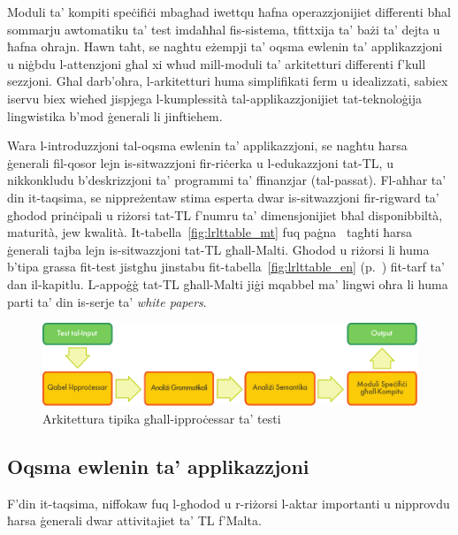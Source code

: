\documentclass[]{../../metanetpaper}
\begin{document}
\begin{multicols}{2}
Moduli ta’ kompiti speċifiċi mbagħad iwettqu ħafna operazzjonijiet differenti bħal sommarju awtomatiku ta’ test imdaħħal fis-sistema, tfittxija ta’ bażi ta' dejta u ħafna oħrajn. Hawn taħt, se nagħtu eżempji ta’ oqsma ewlenin ta’ applikazzjoni u niġbdu l-attenzjoni għal xi wħud mill-moduli ta’ arkitetturi differenti f'kull sezzjoni. Għal darb’oħra, l-arkitetturi huma simplifikati ferm u idealizzati, sabiex iservu biex wieħed jispjega l-kumplessità tal-applikazzjonijiet tat-teknoloġija lingwistika b'mod ġenerali li jinftiehem.

Wara l-introduzzjoni tal-oqsma ewlenin ta’ applikazzjoni, se nagħtu ħarsa ġenerali fil-qosor lejn is-sitwazzjoni fir-riċerka u l-edukazzjoni tat-TL, u nikkonkludu b’deskrizzjoni ta’ programmi ta’ ffinanzjar (tal-passat). Fl-aħħar ta’ din it-taqsima, se nippreżentaw stima esperta dwar is-sitwazzjoni fir-rigward ta’ għodod prinċipali u riżorsi tat-TL f’numru ta’ dimensjonijiet bħal disponibbiltà, maturità, jew kwalità. It-tabella~\ref{fig:lrlttable_mt} fuq paġna~\pageref{fig:lrlttable_mt} tagħti ħarsa ġenerali tajba lejn is-sitwazzjoni tat-TL għall-Malti. Għodod u riżorsi li huma b’tipa grassa fit-test jistgħu jinstabu fit-tabella~\ref{fig:lrlttable_en} (p.~\pageref{fig:lrlttable_en}) fit-tarf ta' dan il-kapitlu. L-appoġġ tat-TL għall-Malti jiġi mqabbel ma' lingwi oħra li huma parti ta' din is-serje ta' \emph{white papers}.

\begin{figure}[htb]
  \center
  \includegraphics[width=\textwidth]{../_media/maltese/text_processing_app_architecture}
  \caption{Arkitettura tipika għall-ipproċessar ta' testi}
  \label{fig:textprocessingarch_mt}
\end{figure}

\subsection{Oqsma ewlenin ta’ applikazzjoni} 

F'din it-taqsima, niffokaw fuq l-għodod u r-riżorsi l-aktar importanti u nipprovdu ħarsa ġenerali dwar attivitajiet ta' TL f'Malta.


\end{multicols}
\end{document}
